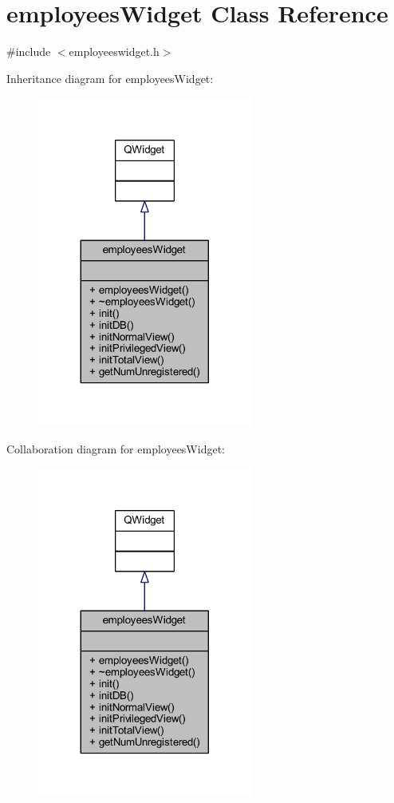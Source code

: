 \hypertarget{classemployees_widget}{}\section{employees\+Widget Class Reference}
\label{classemployees_widget}


{\ttfamily \#include $<$employeeswidget.\+h$>$}



Inheritance diagram for employees\+Widget\+:
\nopagebreak
\begin{figure}[H]
\begin{center}
\leavevmode
\includegraphics[width=200pt]{classemployees_widget__inherit__graph}
\end{center}
\end{figure}


Collaboration diagram for employees\+Widget\+:
\nopagebreak
\begin{figure}[H]
\begin{center}
\leavevmode
\includegraphics[width=200pt]{classemployees_widget__coll__graph}
\end{center}
\end{figure}
